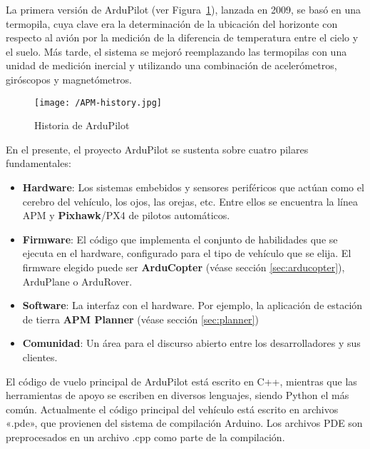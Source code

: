 La primera versión de ArduPilot (ver Figura~\ref{fig:APMHistory}), lanzada en 2009, se basó en una termopila, cuya clave era la determinación de la ubicación del horizonte con respecto al avión por la medición de la diferencia de temperatura entre el cielo y el suelo. Más tarde, el sistema se mejoró reemplazando las termopilas con una unidad de medición inercial y utilizando una combinación de acelerómetros, giróscopos y magnetómetros.

\begin{figure}[!h]
\begin{center}
\texttt{[image: /APM-history.jpg]}
\caption[Historia de ArduPilot]{Historia de ArduPilot \footnotemark}
\label{fig:APMHistory}
\end{center}
\end{figure}


En el presente, el proyecto ArduPilot se sustenta sobre cuatro pilares fundamentales:

\begin{itemize}
\item \textbf{Hardware}: Los sistemas embebidos y sensores periféricos que actúan como el cerebro del vehículo, los ojos, las orejas, etc. Entre ellos se encuentra la línea APM y \textbf{Pixhawk}/PX4 de pilotos automáticos.
\item \textbf{Firmware}: El código que implementa el conjunto de habilidades que se ejecuta en el hardware, configurado para el 
tipo de vehículo que se elija. El firmware elegido puede ser \textbf{ArduCopter} (véase sección \ref{sec:arducopter}), ArduPlane o ArduRover.
\item \textbf{Software}: La interfaz con el hardware. Por ejemplo, la aplicación de estación de tierra \textbf{APM Planner} (véase sección \ref{sec:planner})
\item \textbf{Comunidad}: Un área para el discurso abierto entre los desarrolladores y sus clientes.
\end{itemize}

El código de vuelo principal de ArduPilot está escrito en C++, mientras que las herramientas de apoyo se escriben en diversos lenguajes, siendo Python el más común. Actualmente el código principal del vehículo está escrito en archivos «.pde», que provienen del sistema de compilación Arduino. Los archivos PDE son preprocesados en un archivo .cpp como parte de la compilación.

